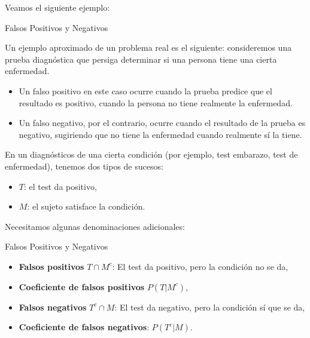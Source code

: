 \documentclass[
  letterpaper,
  DIV=11,
  numbers=noendperiod]{scrreprt}
\providecommand{\tightlist}{%
  \setlength{\itemsep}{0pt}\setlength{\parskip}{0pt}}\usepackage{longtable,booktabs,array}
\begin{document}
Veamos el siguiente ejemplo:

\begin{Ejemplo}{Falsos Positivos y Negativos}{}

Un ejemplo aproximado de un problema real es el siguiente: consideremos
una prueba diagnóstica que persiga determinar si una persona tiene una
cierta enfermedad.

\begin{itemize}
\tightlist
\item
  Un falso positivo en este caso ocurre cuando la prueba predice que el
  resultado es positivo, cuando la persona no tiene realmente la
  enfermedad.
\item
  Un falso negativo, por el contrario, ocurre cuando el resultado de la
  prueba es negativo, sugiriendo que no tiene la enfermedad cuando
  realmente sí la tiene.
\end{itemize}

En un diagnósticos de una cierta condición (por ejemplo, test embarazo,
test de enfermedad), tenemos dos tipos de sucesos:

\begin{itemize}
\tightlist
\item
  \(T\): el test da positivo,
\item
  \(M\): el sujeto satisface la condición.
\end{itemize}

\end{Ejemplo}

Necesitamos algunas denominaciones adicionales:

\begin{Definicion}{Falsos Positivos y Negativos}{}

\begin{itemize}
\tightlist
\item
  \textbf{Falsos positivos} \(T\cap M^c\): El test da positivo, pero la
  condición no se da,
\item
  \textbf{Coeficiente de falsos positivos} \(P(T|M^c)\),
\item
  \textbf{Falsos negativos} \(T^c\cap M\): El test da negativo, pero la
  condición sí que se da,
\item
  \textbf{Coeficiente de falsos negativos}: \(P(T^c|M)\).
\end{itemize}

\end{Definicion}
\end{document}
